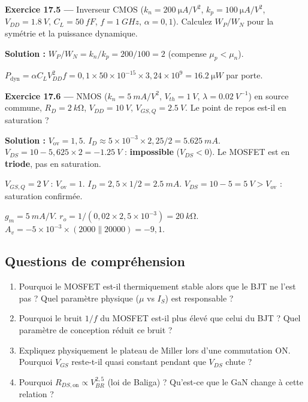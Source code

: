 \documentclass[12pt,a4paper,twoside]{book}
\begin{document}
\textbf{Exercice 17.5 ---} Inverseur CMOS ($k_n = \SI{200}{\micro A/V^2}$, $k_p = \SI{100}{\micro A/V^2}$, $V_{DD} = \SI{1.8}{V}$, $C_L = \SI{50}{fF}$, $f = \SI{1}{GHz}$, $\alpha = 0{,}1$). Calculez $W_P/W_N$ pour la symétrie et la puissance dynamique.

\begin{pratique}
\textbf{Solution :} $W_P/W_N = k_n/k_p = 200/100 = 2$ (compense $\mu_p < \mu_n$).

$P_{\text{dyn}} = \alpha C_L V_{DD}^2 f = 0{,}1\times50\times10^{-15}\times3{,}24\times10^9 = \SI{16.2}{\micro W}$ par porte.
\end{pratique}

\textbf{Exercice 17.6 ---} NMOS ($k_n = \SI{5}{mA/V^2}$, $V_{th} = \SI{1}{V}$, $\lambda = \SI{0.02}{V^{-1}}$) en source commune, $R_D = \SI{2}{k\ohm}$, $V_{DD} = \SI{10}{V}$, $V_{GS,Q} = \SI{2.5}{V}$. Le point de repos est-il en saturation ?

\begin{pratique}
\textbf{Solution :} $V_{\text{ov}} = 1{,}5$. $I_D \approx 5\times10^{-3}\times2{,}25/2 = \SI{5.625}{mA}$. $V_{DS} = 10 - 5{,}625\times2 = \SI{-1.25}{V}$ : \textbf{impossible} ($V_{DS} < 0$). Le MOSFET est en \textbf{triode}, pas en saturation.

$V_{GS,Q} = \SI{2}{V}$ : $V_{\text{ov}} = 1$. $I_D = 2{,}5\times1/2 = \SI{2.5}{mA}$. $V_{DS} = 10-5 = \SI{5}{V} > V_{\text{ov}}$ : saturation confirmée.

$g_m = \SI{5}{mA/V}$. $r_o = 1/(0{,}02\times2{,}5\times10^{-3}) = \SI{20}{k\ohm}$. $A_v = -5\times10^{-3}\times(2000\parallel20000) = -9{,}1$.
\end{pratique}

\subsection*{Questions de compréhension}

\begin{enumerate}[nosep]
\item Pourquoi le MOSFET est-il thermiquement stable alors que le BJT ne l'est pas ? Quel paramètre physique ($\mu$ vs $I_S$) est responsable ?
\item Pourquoi le bruit $1/f$ du MOSFET est-il plus élevé que celui du BJT ? Quel paramètre de conception réduit ce bruit ?
\item Expliquez physiquement le plateau de Miller lors d'une commutation ON. Pourquoi $V_{GS}$ reste-t-il quasi constant pendant que $V_{DS}$ chute ?
\item Pourquoi $R_{DS,\text{on}} \propto V_{BR}^{2{,}5}$ (loi de Baliga) ? Qu'est-ce que le GaN change à cette relation ?
\end{enumerate}
\end{document}

